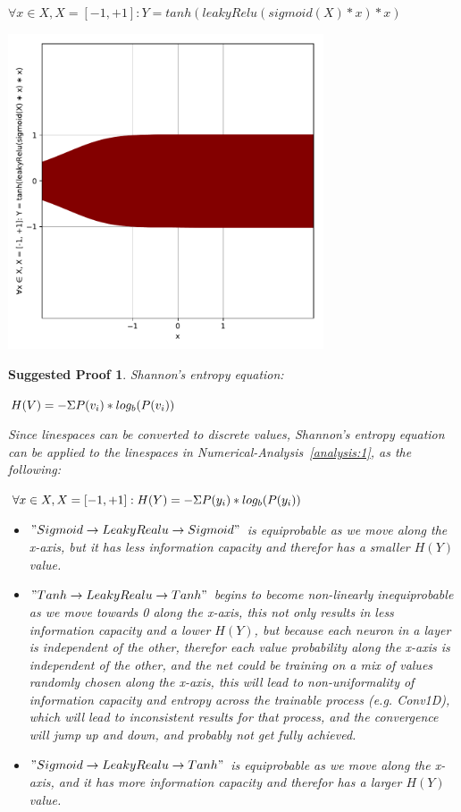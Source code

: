 \documentclass[a4paper, 12pt]{report}
\newtheorem{suggestedproof}{Suggested Proof}
\begin{document}
\begin{blockfigure}{$ \forall x \in X, X = [-1, +1] : Y = tanh(leakyRelu(sigmoid(X) * x) * x) $}
	\begin{center}
		\includegraphics[width = 0.7\textwidth]{sigmoid_leakyRelu_tanh}
	\end{center}
\end{blockfigure}
\begin{suggestedproof}
	Shannon's entropy equation:
	\begin{center}
		$ H(V) = - \Sigma \space P(v_{i})*log_{b}(P(v_{i})) $
	\end{center}
	Since linespaces can be converted to discrete values, Shannon's entropy equation can be applied to the linespaces in Numerical-Analysis~\ref{analysis:1}, as the following:\\
	\begin{center}
		$ \forall x \in X, X = [-1, +1]: H(Y) = - \Sigma \space P(y_{i})*log_{b}(P(y_{i})) $
	\end{center}
	\begin{itemize}
		\item $" Sigmoid \rightarrow LeakyRealu \rightarrow Sigmoid "$ is equiprobable as we move along the x-axis, but it has less information capacity and therefor has a smaller $ H(Y) $ value.
		\item $" Tanh \rightarrow LeakyRealu \rightarrow Tanh "$ begins to become non-linearly inequiprobable as we move towards 0 along the x-axis, this not only results in less information capacity and a lower $ H(Y) $, but because each neuron in a layer is independent of the other, therefor each value probability along the x-axis is independent of the other, and the net could be training on a mix of values randomly chosen along the x-axis, this will lead to non-uniformality of information capacity and entropy across the trainable process (e.g. Conv1D), which will lead to inconsistent results for that process, and the convergence will jump up and down, and probably not get fully achieved.
		\item $" Sigmoid \rightarrow LeakyRealu \rightarrow Tanh "$ is equiprobable as we move along the x-axis, and it has more information capacity and therefor has a larger $ H(Y) $ value. 
	\end{itemize}
\end{suggestedproof}
\newpage
\end{document}
